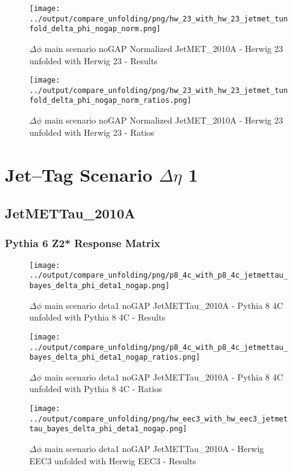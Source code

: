 \documentclass[11pt]{book}
\begin{document}
\begin{figure}[ht]
\centering
\texttt{[image: ../output/compare\_unfolding/png/hw\_23\_with\_hw\_23\_jetmet\_tunfold\_delta\_phi\_nogap\_norm.png]}
\caption{$\Delta\phi$ main scenario noGAP Normalized JetMET\_2010A - Herwig 23 unfolded with Herwig 23 - Results}
\label{hw_23_hw_23_jetmet_tunfold_delta_phi_nogap_norm_a}
\end{figure}

\begin{figure}[ht]
\centering
\texttt{[image: ../output/compare\_unfolding/png/hw\_23\_with\_hw\_23\_jetmet\_tunfold\_delta\_phi\_nogap\_norm\_ratios.png]}
\caption{$\Delta\phi$ main scenario noGAP Normalized JetMET\_2010A - Herwig 23 unfolded with Herwig 23 - Ratios}
\label{hw_23_hw_23_jetmet_tunfold_delta_phi_nogap_norm_b}
\end{figure}


\newpage
\chapter{Jet--Tag Scenario $\Delta\eta$ 1}
\section{JetMETTau\_2010A}
\subsection{Pythia 6 Z2* Response Matrix}



\begin{figure}[ht]
\centering
\texttt{[image: ../output/compare\_unfolding/png/p8\_4c\_with\_p8\_4c\_jetmettau\_bayes\_delta\_phi\_deta1\_nogap.png]}
\caption{$\Delta\phi$ main scenario deta1 noGAP JetMETTau\_2010A - Pythia 8 4C unfolded with Pythia 8 4C - Results}
\label{p8_p8_jetmettau_bayes_delta_phi_deta1_nogap_a}
\end{figure}

\begin{figure}[ht]
\centering
\texttt{[image: ../output/compare\_unfolding/png/p8\_4c\_with\_p8\_4c\_jetmettau\_bayes\_delta\_phi\_deta1\_nogap\_ratios.png]}
\caption{$\Delta\phi$ main scenario deta1 noGAP JetMETTau\_2010A - Pythia 8 4C unfolded with Pythia 8 4C - Ratios}
\label{p8_p8_jetmettau_bayes_delta_phi_deta1_nogap_b}
\end{figure}

\begin{figure}[ht]
\centering
\texttt{[image: ../output/compare\_unfolding/png/hw\_eec3\_with\_hw\_eec3\_jetmettau\_bayes\_delta\_phi\_deta1\_nogap.png]}
\caption{$\Delta\phi$ main scenario deta1 noGAP JetMETTau\_2010A - Herwig EEC3 unfolded with Herwig EEC3 - Results}
\label{hw_eec3_hw_eec3_jetmettau_bayes_delta_phi_deta1_nogap_a}
\end{figure}
\end{document}
